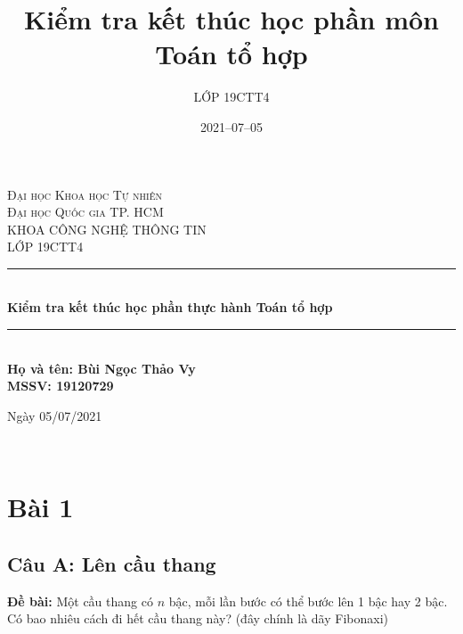 \documentclass[12pt]{article}
\title{Kiểm tra kết thúc học phần môn Toán tổ hợp}
\author{LỚP 19CTT4}
\date{2021–07–05}
\begin{document}
\begin{sloppypar}

\begin{titlepage}
    
    \newcommand{\HRule}{\rule{\linewidth}{0.5mm}} %
    
    \center %
    \vspace*{\fill}
     
    \textsc{\LARGE Đại học Khoa học Tự nhiên}\\[0.2cm]
    \textsc{\large Đại học Quốc gia TP. HCM }\\[1.5cm] 
    \textsc{\Large KHOA CÔNG NGHỆ THÔNG TIN}\\[0.2cm] 
    \textsc{\large LỚP 19CTT4 }\\[0.5cm]
    \HRule \\[0.4cm]
    { \huge \bfseries Kiểm tra kết thúc học phần thực hành\break 
    Toán tổ hợp}\\[0.4cm] %
    \HRule \\[1.5cm]
    \LARGE \textbf {Họ và tên: Bùi Ngọc Thảo Vy \\}
    \LARGE \textbf {MSSV: 19120729 \\}
    
    \begin{minipage}{1\textwidth}
    \begin{center}
        \LARGE Ngày 05/07/2021
    \end{center}
    \end{minipage}\\[2cm]
    \vspace*{\fill} %
    \end{titlepage}


    \renewcommand*\contentsname{\begin{center} \LARGE Mục lục \end{center}}
    \tableofcontents
    \pagebreak
\section{Bài 1}
\subsection{Câu A: Lên cầu thang}

\begin{tcolorbox}
    \textbf{Đề bài:} Một cầu thang có \(n\) bậc, mỗi lần bước có thể bước lên 1 bậc hay 2 bậc. Có bao nhiêu cách đi hết cầu thang này? (đây chính là dãy Fibonaxi)
\end{tcolorbox}


\end{sloppypar}
\end{document}
